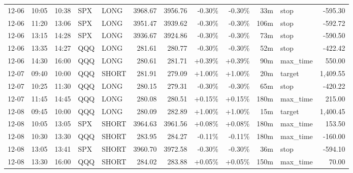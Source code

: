 \documentclass[11pt,a4paper,twoside]{article}
\begin{document}
\begin{center}
\begin{longtable}{>{\color{txtmain}}l l l l l r r r r r >{\color{txtmain}}l r}
12-06 & 10:05 & 10:38 & SPX & LONG & 3968.67 & 3956.76 & \textcolor{lossred}{-0.30\%} & \textcolor{lossred}{-0.30\%} & 33m & stop & \textcolor{lossred}{-595.30} \\
12-06 & 11:20 & 13:06 & SPX & LONG & 3951.47 & 3939.62 & \textcolor{lossred}{-0.30\%} & \textcolor{lossred}{-0.30\%} & 106m & stop & \textcolor{lossred}{-592.72} \\
12-06 & 13:15 & 14:28 & SPX & LONG & 3936.67 & 3924.86 & \textcolor{lossred}{-0.30\%} & \textcolor{lossred}{-0.30\%} & 73m & stop & \textcolor{lossred}{-590.50} \\
12-06 & 13:35 & 14:27 & QQQ & LONG & 281.61 & 280.77 & \textcolor{lossred}{-0.30\%} & \textcolor{lossred}{-0.30\%} & 52m & stop & \textcolor{lossred}{-422.42} \\
12-06 & 14:30 & 16:00 & QQQ & LONG & 280.61 & 281.71 & \textcolor{wingreen}{+0.39\%} & \textcolor{wingreen}{+0.39\%} & 90m & max\_time & \textcolor{wingreen}{550.00} \\
12-07 & 09:40 & 10:00 & QQQ & SHORT & 281.91 & 279.09 & \textcolor{wingreen}{+1.00\%} & \textcolor{wingreen}{+1.00\%} & 20m & target & \textcolor{wingreen}{1,409.55} \\
12-07 & 10:25 & 11:30 & QQQ & LONG & 280.15 & 279.31 & \textcolor{lossred}{-0.30\%} & \textcolor{lossred}{-0.30\%} & 65m & stop & \textcolor{lossred}{-420.22} \\
12-07 & 11:45 & 14:45 & QQQ & LONG & 280.08 & 280.51 & \textcolor{wingreen}{+0.15\%} & \textcolor{wingreen}{+0.15\%} & 180m & max\_time & \textcolor{wingreen}{215.00} \\
12-08 & 09:45 & 10:00 & QQQ & LONG & 280.09 & 282.89 & \textcolor{wingreen}{+1.00\%} & \textcolor{wingreen}{+1.00\%} & 15m & target & \textcolor{wingreen}{1,400.45} \\
12-08 & 10:05 & 13:05 & SPX & SHORT & 3964.63 & 3961.56 & \textcolor{wingreen}{+0.08\%} & \textcolor{wingreen}{+0.08\%} & 180m & max\_time & \textcolor{wingreen}{153.50} \\
12-08 & 10:30 & 13:30 & QQQ & SHORT & 283.95 & 284.27 & \textcolor{lossred}{-0.11\%} & \textcolor{lossred}{-0.11\%} & 180m & max\_time & \textcolor{lossred}{-160.00} \\
12-08 & 13:05 & 13:41 & SPX & SHORT & 3960.70 & 3972.58 & \textcolor{lossred}{-0.30\%} & \textcolor{lossred}{-0.30\%} & 36m & stop & \textcolor{lossred}{-594.10} \\
12-08 & 13:30 & 16:00 & QQQ & SHORT & 284.02 & 283.88 & \textcolor{wingreen}{+0.05\%} & \textcolor{wingreen}{+0.05\%} & 150m & max\_time & \textcolor{wingreen}{70.00} \\

\end{longtable}
\end{center}
\end{document}
